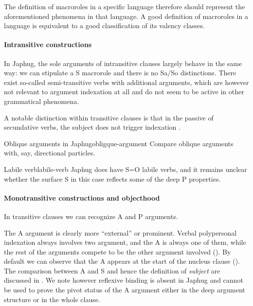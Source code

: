 \documentclass[a4paper, oneside, 12pt]{report}
\newcommand*{\citesec}[1]{\S~{#1}}
\newcommand*{\citepage}[1]{p.~{#1}}
\newcommand*{\term}[1]{\emph{#1}}
\begin{document}
The definition of macroroles in a specific language therefore should represent 
the aforementioned phenomena in that language.
A good definition of macroroles in a language
is equivalent to a good classification of its valency classes.

\paragraph*{Intransitive constructions}
In Japhug, the sole arguments of intransitive clauses largely behave in the same way:
we can stipulate a S macrorole and there is no Sa/So distinctions. 
There exist so-called semi-transitive verbs with additional arguments,
which are however not relevant to argument indexation at all
\citep[\citesec{14.2.5}]{jacques2021grammar}
and do not seem to be active in other grammatical phenomena.

A notable distinction within transitive clauses
is that in the passive of secundative verbs,
the subject does not trigger indexation
\citep[\citesec{18.1.4}]{jacques2021grammar}.

\begin{todobox}{Oblique arguments in Japhug}{obligque-argument}
    Compare oblique arguments with, say, directional particles.
\end{todobox}

\begin{todobox}{Labile verb}{labile-verb}
    Japhug does have S=O labile verbs,
    and it remains unclear whether the surface S in this case
    reflects some of the deep P properties. 
\end{todobox}

\paragraph*{Monotransitive constructions and objecthood}
In transitive clauses we can recognize A and P arguments.

The A argument is clearly more ``external'' or prominent.
Verbal polypersonal indexation always involves two argument,
and the A is always one of them, 
while the rest of the arguments compete to be the other argument involved 
().
By default we can observe that the A 
appears at the start of the nucleus clause 
().
The comparison between A and S and hence the definition of \term{subject}
are discussed in .
We note however reflexive binding is absent in Japhug
\citep[\citepage{543}]{jacques2021grammar}
and cannot be used to prove the pivot status of the A argument
either in the deep argument structure or in the whole clause.
\end{document}
